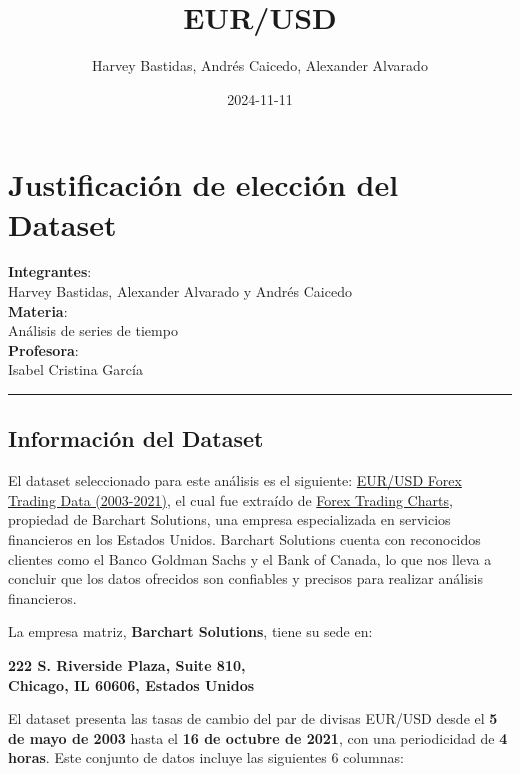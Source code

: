\documentclass[
]{book}
\title{EUR/USD}
\author{Harvey Bastidas, Andrés Caicedo, Alexander Alvarado}
\date{2024-11-11}
\begin{document}
\maketitle

{
\setcounter{tocdepth}{1}
\tableofcontents
}
\chapter{Justificación de elección del Dataset}\label{justificaciuxf3n-de-elecciuxf3n-del-dataset}

\textbf{Integrantes}:\\
Harvey Bastidas, Alexander Alvarado y Andrés Caicedo\\
\textbf{Materia}:\\
Análisis de series de tiempo\\
\textbf{Profesora}:\\
Isabel Cristina García

\begin{center}\rule{0.5\linewidth}{0.5pt}\end{center}

\section{Información del Dataset}\label{informaciuxf3n-del-dataset}

El dataset seleccionado para este análisis es el siguiente: \href{https://www.kaggle.com/datasets/chandrimad31/eurusd-forex-trading-data-20032021}{EUR/USD Forex Trading Data (2003-2021)}, el cual fue extraído de \href{https://forex.tradingcharts.com/}{Forex Trading Charts}, propiedad de Barchart Solutions, una empresa especializada en servicios financieros en los Estados Unidos. Barchart Solutions cuenta con reconocidos clientes como el Banco Goldman Sachs y el Bank of Canada, lo que nos lleva a concluir que los datos ofrecidos son confiables y precisos para realizar análisis financieros.

La empresa matriz, \textbf{Barchart Solutions}, tiene su sede en:

\textbf{222 S. Riverside Plaza, Suite 810,\\
Chicago, IL 60606, Estados Unidos}

El dataset presenta las tasas de cambio del par de divisas EUR/USD desde el \textbf{5 de mayo de 2003} hasta el \textbf{16 de octubre de 2021}, con una periodicidad de \textbf{4 horas}. Este conjunto de datos incluye las siguientes 6 columnas:
\end{document}
